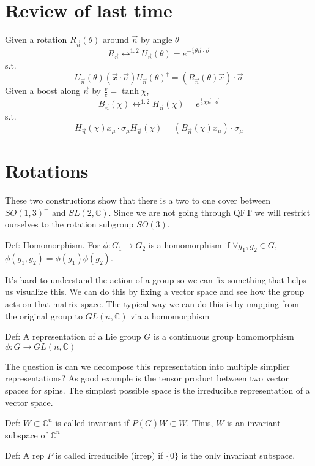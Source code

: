 \section{Review of last time}
Given a rotation $R_{\vec{n}}(\theta)$ around $\vec{n}$ by angle $\theta$
$$
    R_{\vec{n}} \longleftrightarrow^{1:2} U_{\vec{n}}(\theta) =
    e^{-\frac{i}{2}\theta \vec{n}\cdot\vec{\sigma}}
$$
s.t.
$$
    U_{\vec{n}}(\theta) \left(\vec{x}\cdot\vec{\sigma}\right)
    U_{\vec{n}}(\theta)^\dagger = 
    \left(R_{\vec{n}}(\theta) \vec{x}\right)\cdot \vec{\sigma}
$$
Given a boost along $\vec{n}$ by $\frac{v}{c} = \tanh \chi$,
$$
B_{\vec{n}}(\chi) \longleftrightarrow^{1:2} H_{\vec{n}}(\chi) = 
e^{\frac{1}{2} \chi \vec{n}\cdot\vec{\sigma}}
$$
s.t.
$$
H_{\vec{n}}(\chi) x_{\mu} \cdot \sigma_{\mu} H_{\vec{n}}(\chi) =
    \left(B_{\vec{n}}(\chi) x_{\mu}\right) \cdot \sigma_{\mu}
$$

\section{Rotations}
These two constructions show that there is a two to one cover between
$SO(1,3)^+$ and $SL(2, \mathbb{C})$. Since we are not going through QFT
we will restrict ourselves to the rotation subgroup $SO(3)$.

Def: Homomorphism. For $\phi: G_1 \rightarrow G_2$ is a homomorphism if
$\forall g_1, g_2 \in G$, $\phi(g_1, g_2) = \phi(g_1) \phi(g_2)$.

It's hard to understand the action of a group so we can fix
something that helps us visualize this. We can do this by
fixing a vector space and see how the group acts
on that matrix space. The typical way we can do this
is by mapping from the original group to $GL(n, \mathbb{C})$
via a homomorphism

Def: A representation of a Lie group $G$ is a continuous
group homomorphism $\phi: G \rightarrow GL(n, \mathbb{C})$

The question is can we decompose this representation into
multiple simplier representations? As good example is the tensor
product between two vector spaces for spins. The simplest possible
space is the irreducible representation of a vector space.

Def: $W \subset \mathbb{C}^n$ is called invariant if $P(G)W \subset W$. Thus,
$W$ is an invariant subspace of $\mathbb{C}^n$

Def: A rep $P$ is called irreducible (irrep) if
$\{0\}$ is the only invariant subspace.

